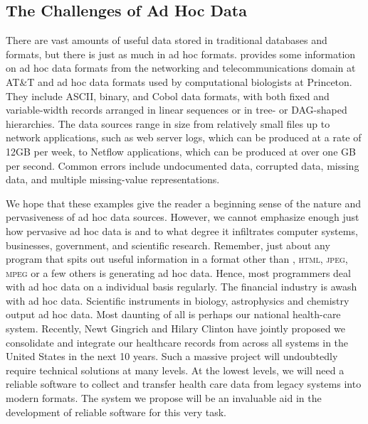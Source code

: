 \documentclass[11pt]{article}
\begin{document}
\subsection{The Challenges of Ad Hoc Data}

There are vast amounts of useful data stored in traditional databases
and \xml{} formats, but there is just as much in ad hoc formats.
 provides some information on ad hoc data
formats from the networking and telecommunications domain at AT\&T and
ad hoc data formats used by computational biologists at Princeton.
They include ASCII, binary, and Cobol data formats, with both fixed
and variable-width records arranged in linear sequences or in tree- or
DAG-shaped hierarchies.  The data sources range in size from
relatively small files up to network applications, such as web server
logs, which can be produced at a rate of 12GB per week, to Netflow
applications, which can be produced at over one GB per second.  Common
errors include undocumented data, corrupted data, missing data, and
multiple missing-value representations.

We hope that these examples give the reader a beginning sense of the
nature and pervasiveness of ad hoc data sources.  However, we cannot
emphasize enough just how pervasive ad hoc data is and to what degree
it infiltrates computer systems, businesses, government, and
scientific research.  Remember, just about any program that spits out
useful information in a format other than \xml{}, \textsc{html},
\textsc{jpeg}, \textsc{mpeg} or a few others is generating ad hoc
data.  Hence, most programmers deal with ad hoc data on a individual
basis regularly.  The financial industry is awash with ad hoc data.
Scientific instruments in biology, astrophysics and chemistry output
ad hoc data.  Most daunting of all is perhaps our national
health-care system.  Recently, Newt Gingrich and Hilary Clinton have
jointly proposed we consolidate and integrate our healthcare
records from across all systems in the United States
in the next 10 years.  Such a massive project will undoubtedly
require technical solutions at many levels.  At the lowest levels, we
will need a reliable software to collect and transfer health care data
from legacy systems into modern formats.  The \datatype{} system we
propose will be an invaluable aid in the development of reliable software
for this very task.
\end{document}
